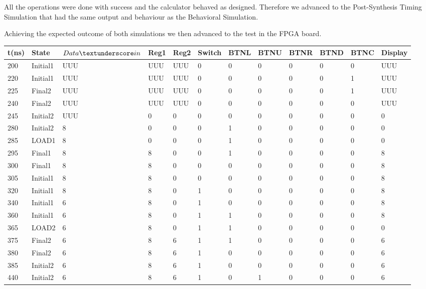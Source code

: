 \documentclass[12pt]{article}
\begin{document}
All the operations were done with success and the calculator behaved as designed. Therefore we advanced to the Post-Synthesis Timing Simulation that had the same output and behaviour as the Behavioral Simulation. 

Achieving the expected outcome of both simulations we then advanced to the test in the FPGA board.

\begin{table}[H]
   
    \hskip-1.0cm\begin{tabular}{|l|l|l|l|l|l|l|l|l|l|l|l|}
    \hline
        t(ns) & State & $Data\textunderscore in$  & Reg1 & Reg2 & Switch & BTNL & BTNU & BTNR & BTND& BTNC& Display\\
        \hline
        200 & Initial1 & UUU & UUU&UUU&0&0&0&0&0&0&UUU\\
        \hline
         220 & Initial1 & UUU & UUU&UUU&0&0&0&0&0&1&UUU\\
        \hline
         225 & Final2 & UUU & UUU&UUU&0&0&0&0&0&1&UUU\\
        \hline
        240 & Final2 & UUU & UUU&UUU&0&0&0&0&0&0&UUU\\
        \hline
        245 & Initial2 & UUU & 0&0&0&0&0&0&0&0&0\\
        \hline
        280 & Initial2 & 8 & 0&0&0&1&0&0&0&0&0\\
        \hline
        285 & LOAD1 & 8 & 0&0&0&1&0&0&0&0&0\\
        \hline
        295 & Final1 & 8 & 8&0&0&1&0&0&0&0&8\\
        \hline
        300 & Final1 & 8 & 8&0&0&0&0&0&0&0&8\\
        \hline
        305 & Initial1 & 8 & 8&0&0&0&0&0&0&0&8\\
        \hline
        320 & Initial1 & 8 & 8&0&1&0&0&0&0&0&8\\
        \hline
        340 & Initial1 & 6 & 8&0&1&0&0&0&0&0&8\\
        \hline
        360 & Initial1 & 6 & 8&0&1&1&0&0&0&0&8\\
        \hline
        365 & LOAD2 & 6 & 8&0&1&1&0&0&0&0&0\\
        \hline
        375 & Final2 & 6 & 8&6&1&1&0&0&0&0&6\\
        \hline
        380 & Final2 & 6 & 8&6&1&0&0&0&0&0&6\\
        \hline
        385 & Initial2 & 6 & 8&6&1&0&0&0&0&0&6\\
        \hline
        440 & Initial2 & 6 & 8&6&1&0&1&0&0&0&6\\

\end{tabular}
\end{table}
\end{document}
